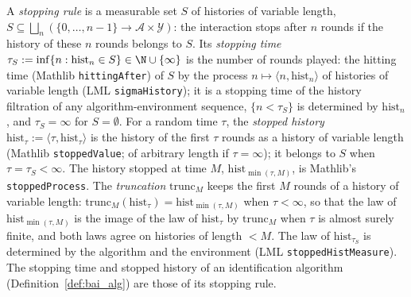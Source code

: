 \begin{definition}\label{def:stopping_rule}
\leanok
{}
A \emph{stopping rule} is a measurable set $S$ of histories of variable length,
$S \subseteq \bigsqcup_n (\{0,\dots,n-1\}\to\mathcal{A}\times\mathcal{Y})$: the interaction stops after
$n$ rounds if the history of these $n$ rounds belongs to $S$. Its \emph{stopping time}
$\tau_S := \inf\{n : \mathrm{hist}_n \in S\} \in \N\cup\{\infty\}$ is the number of rounds
played: the hitting time (Mathlib \texttt{hittingAfter}) of $S$ by the process
$n \mapsto \langle n, \mathrm{hist}_n\rangle$ of histories of variable length (LML
\texttt{sigmaHistory}); it is a stopping time of the history filtration of any
algorithm-environment sequence, $\{n < \tau_S\}$ is determined by $\mathrm{hist}_n$, and
$\tau_S = \infty$ for $S = \emptyset$. For a random time $\tau$, the \emph{stopped history}
$\mathrm{hist}_\tau := \langle\tau, \mathrm{hist}_\tau\rangle$ is the history of the first $\tau$
rounds as a history of variable length (Mathlib \texttt{stoppedValue}; of arbitrary length if
$\tau = \infty$); it belongs to $S$ when $\tau = \tau_S < \infty$. The history stopped at time
$M$, $\mathrm{hist}_{\min(\tau,M)}$, is Mathlib's \texttt{stoppedProcess}. The \emph{truncation}
$\mathrm{trunc}_M$ keeps the first $M$ rounds of a history of variable length:
$\mathrm{trunc}_M(\mathrm{hist}_\tau) = \mathrm{hist}_{\min(\tau,M)}$ when $\tau < \infty$, so
that the law of $\mathrm{hist}_{\min(\tau,M)}$ is the image of the law of $\mathrm{hist}_\tau$ by
$\mathrm{trunc}_M$ when $\tau$ is almost surely finite, and both laws agree on histories of
length $< M$. The law of $\mathrm{hist}_{\tau_S}$ is determined by the algorithm and the
environment (LML \texttt{stoppedHistMeasure}). The stopping time and stopped history of an
identification algorithm (Definition~\ref{def:bai_alg}) are those of its stopping rule.
\end{definition}

